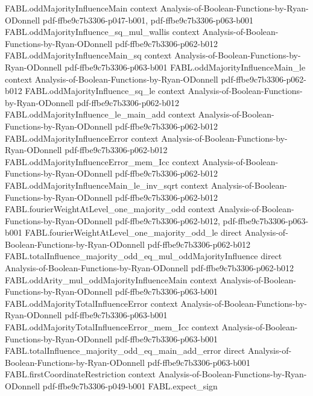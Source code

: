 \begin{theorem}
\proofstep
  {FABL.oddMajorityInfluenceMain}
  {context}
  {Analysis-of-Boolean-Functions-by-Ryan-ODonnell}
  {pdf-ffbe9c7b3306-p047-b001,
    pdf-ffbe9c7b3306-p063-b001}
\proofstep
  {FABL.oddMajorityInfluence_sq_mul_wallis}
  {context}
  {Analysis-of-Boolean-Functions-by-Ryan-ODonnell}
  {pdf-ffbe9c7b3306-p062-b012}
\proofstep
  {FABL.oddMajorityInfluenceMain_sq}
  {context}
  {Analysis-of-Boolean-Functions-by-Ryan-ODonnell}
  {pdf-ffbe9c7b3306-p063-b001}
\proofstep
  {FABL.oddMajorityInfluenceMain_le}
  {context}
  {Analysis-of-Boolean-Functions-by-Ryan-ODonnell}
  {pdf-ffbe9c7b3306-p062-b012}
\proofstep
  {FABL.oddMajorityInfluence_sq_le}
  {context}
  {Analysis-of-Boolean-Functions-by-Ryan-ODonnell}
  {pdf-ffbe9c7b3306-p062-b012}
\proofstep
  {FABL.oddMajorityInfluence_le_main_add}
  {context}
  {Analysis-of-Boolean-Functions-by-Ryan-ODonnell}
  {pdf-ffbe9c7b3306-p062-b012}
\proofstep
  {FABL.oddMajorityInfluenceError}
  {context}
  {Analysis-of-Boolean-Functions-by-Ryan-ODonnell}
  {pdf-ffbe9c7b3306-p062-b012}
\proofstep
  {FABL.oddMajorityInfluenceError_mem_Icc}
  {context}
  {Analysis-of-Boolean-Functions-by-Ryan-ODonnell}
  {pdf-ffbe9c7b3306-p062-b012}
\proofstep
  {FABL.oddMajorityInfluenceMain_le_inv_sqrt}
  {context}
  {Analysis-of-Boolean-Functions-by-Ryan-ODonnell}
  {pdf-ffbe9c7b3306-p062-b012}
\proofstep
  {FABL.fourierWeightAtLevel_one_majority_odd}
  {context}
  {Analysis-of-Boolean-Functions-by-Ryan-ODonnell}
  {pdf-ffbe9c7b3306-p062-b012,
    pdf-ffbe9c7b3306-p063-b001}
\proofstep
  {FABL.fourierWeightAtLevel_one_majority_odd_le}
  {direct}
  {Analysis-of-Boolean-Functions-by-Ryan-ODonnell}
  {pdf-ffbe9c7b3306-p062-b012}
\proofstep
  {FABL.totalInfluence_majority_odd_eq_mul_oddMajorityInfluence}
  {direct}
  {Analysis-of-Boolean-Functions-by-Ryan-ODonnell}
  {pdf-ffbe9c7b3306-p062-b012}
\proofstep
  {FABL.oddArity_mul_oddMajorityInfluenceMain}
  {context}
  {Analysis-of-Boolean-Functions-by-Ryan-ODonnell}
  {pdf-ffbe9c7b3306-p063-b001}
\proofstep
  {FABL.oddMajorityTotalInfluenceError}
  {context}
  {Analysis-of-Boolean-Functions-by-Ryan-ODonnell}
  {pdf-ffbe9c7b3306-p063-b001}
\proofstep
  {FABL.oddMajorityTotalInfluenceError_mem_Icc}
  {context}
  {Analysis-of-Boolean-Functions-by-Ryan-ODonnell}
  {pdf-ffbe9c7b3306-p063-b001}
\proofstep
  {FABL.totalInfluence_majority_odd_eq_main_add_error}
  {direct}
  {Analysis-of-Boolean-Functions-by-Ryan-ODonnell}
  {pdf-ffbe9c7b3306-p063-b001}
\proofstep
  {FABL.firstCoordinateRestriction}
  {context}
  {Analysis-of-Boolean-Functions-by-Ryan-ODonnell}
  {pdf-ffbe9c7b3306-p049-b001}
\proofstep
  {FABL.expect_sign}

\end{theorem}
